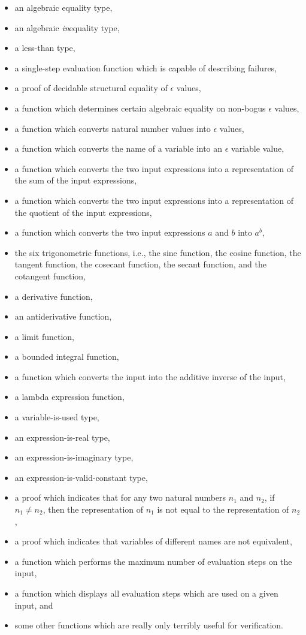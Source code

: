 \documentclass{report}
\begin{document}
\begin{itemize}
  \item an algebraic equality type,
  \item an algebraic \emph{in}equality type,
  \item a less-than type,
  \item a single-step evaluation function which is capable of describing failures,
  \item a proof of decidable structural equality of \(\epsilon\) values,
  \item a function which determines certain algebraic equality on non-bogus \(\epsilon\) values,
  \item a function which converts natural number values into \(\epsilon\) values,
  \item a function which converts the name of a variable into an \(\epsilon\) variable value,
  \item a function which converts the two input expressions into a representation of the sum of the input expressions,
  \item a function which converts the two input expressions into a representation of the quotient of the input expressions,
  \item a function which converts the two input expressions \(a\) and \(b\) into \(a^b\),
  \item the six trigonometric functions, i.e., the sine function, the cosine function, the tangent function, the cosecant function, the secant function, and the cotangent function,
  \item a derivative function,
  \item an antiderivative function,
  \item a limit function,
  \item a bounded integral function,
  \item a function which converts the input into the additive inverse of the input,
  \item a lambda expression function,
  \item a variable-is-used type,
  \item an expression-is-real type,
  \item an expression-is-imaginary type,
  \item an expression-is-valid-constant type,
  \item a proof which indicates that for any two natural numbers \(n_1\) and \(n_2\), if \(n_1 \neq n_2\), then the representation of \(n_1\) is not equal to the representation of \(n_2\),
  \item a proof which indicates that variables of different names are not equivalent,
  \item a function which performs the maximum number of evaluation steps on the input,
  \item a function which displays all evaluation steps which are used on a given input, and
  \item some other functions which are really only terribly useful for verification.
\end{itemize}
\end{document}
